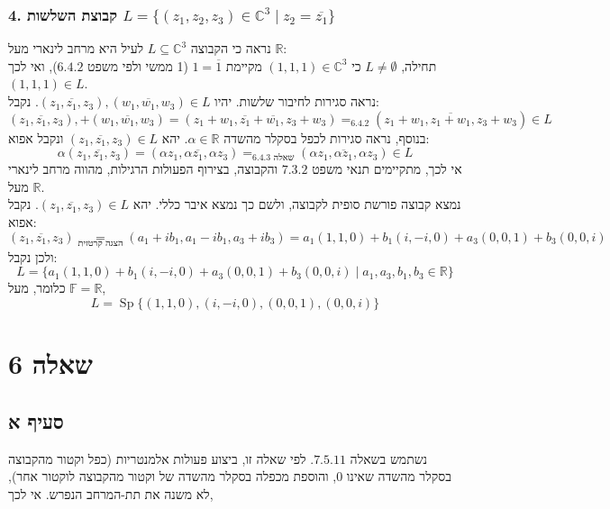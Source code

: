 \documentclass{article}
\newcommand\underrel[2]{\mathrel{\mathop{#2}\limits_{#1}}}
\DeclareMathOperator*{\equals}{=}
\DeclareMathOperator\Sp{Sp}
\begin{document}
\subsubsection*{4. קבוצת השלשות $
        L = \{(z_1,z_2,z_3)\in \mathbb{C}^3 \; | \; z_2 = \overline{z_1}\}
    $}
נראה כי הקבוצה $L\subseteq \mathbb{C}^3$ לעיל היא מרחב לינארי מעל $\mathbb{R}$: \\
תחילה, $L\ne \emptyset$
כי $(1,1,1)\in \mathbb{C}^3$ מקיימת $1=\overline{1}$ (1 ממשי ולפי משפט $6.4.2$),
ואי לכך $(1,1,1)\in L$. \\
נראה סגירות לחיבור שלשות. יהיו $(z_1,\overline{z_1}, z_3), (w_1, \overline{w_1}, w_3)\in L$. נקבל:
\[
    (z_1,\overline{z_1}, z_3),+ (w_1, \overline{w_1}, w_3) =
    (z_1+w_1, \overline{z_1}+\overline{w_1}, z_3+w_3) \equals_{6.4.2}
    (z_1+w_1, \overline{z_1+w_1}, z_3+w_3)\in L
\]
בנוסף, נראה סגירות לכפל בסקלר מהשדה $\alpha \in \mathbb{R}$. יהא $(z_1, \overline{z_1}, z_3)\in L$ ונקבל אפוא:
\[
    \alpha (z_1, \overline{z_1}, z_3) =
    (\alpha z_1, \alpha \overline{z_1}, \alpha z_3) \equals_{\text{שאלה 6.4.3} }
    (\alpha z_1, \overline{\alpha z_1}, \alpha z_3) \in L
\]
אי לכך, מתקיימים תנאי משפט $7.3.2$ והקבוצה, בצירוף הפעולות הרגילות, מהווה מרחב לינארי מעל $\mathbb{R}$. \\
נמצא קבוצה פורשת סופית לקבוצה, ולשם כך נמצא איבר כללי. יהא $(z_1, \overline{z_1}, z_3)\in L$. נקבל אפוא:
\[
    (z_1, \overline{z_1}, z_3) \underrel{\text{הצגה קרטזית}}{=}
    (a_1+ib_1, a_1-ib_1, a_3+ib_3) =
    a_1(1,1,0)+b_1(i,-i, 0)+a_3(0,0,1)+b_3(0,0,i)
\]
ולכן נקבל:
\[
    L=\{a_1(1,1,0)+b_1(i,-i, 0)+a_3(0,0,1)+b_3(0,0,i) \; | \; a_1, a_3, b_1, b_3 \in \mathbb{R} \}
\]
כלומר, מעל $\mathbb{F}=\mathbb{R}$,
\[
    L=\Sp\{(1,1,0),(i,-i, 0),(0,0,1),(0,0,i) \}
\]

\pagebreak

\section*{שאלה 6}

\subsection*{סעיף א}
נשתמש בשאלה $7.5.11$.
לפי שאלה זו, ביצוע פעולות אלמנטריות (כפל וקטור מהקבוצה בסקלר מהשדה שאינו 0, והוספת מכפלה בסקלר מהשדה של וקטור מהקבוצה לוקטור אחר), לא משנה את תת-המרחב הנפרש.
אי לכך,
\end{document}
